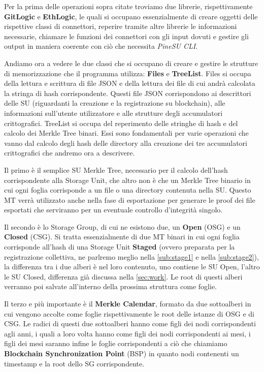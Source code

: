 Per la prima delle operazioni sopra citate troviamo due librerie, rispettivamente \textbf{GitLogic} e \textbf{EthLogic}, le quali si occupano essenzialmente di creare oggetti delle rispettive classi di connettori, reperire tramite altre librerie le informazioni necessarie, chiamare le funzioni dei connettori con gli input dovuti e gestire gli output in maniera coerente con ciò che necessita \emph{PineSU CLI}.

Andiamo ora a vedere le due classi che si occupano di creare e gestire le strutture di memorizzazione che il programma utilizza: \textbf{Files} e \textbf{TreeList}.
Files si occupa della lettura e scrittura di file JSON e della lettura dei file di cui andrà calcolata la stringa di hash corrispondente. Questi file JSON corrispondono ai descrittori delle SU (riguardanti la creazione e la registrazione su blockchain), alle informazioni sull’utente utilizzatore e alle strutture degli accumulatori crittografici.
TreeList si occupa del reperimento delle stringhe di hash e del calcolo dei Merkle Tree binari.
Essi sono fondamentali per varie operazioni che vanno dal calcolo degli hash delle directory alla creazione dei tre accumulatori crittografici che andremo ora a descrivere.

Il primo è il semplice SU Merkle Tree, necessario per il calcolo dell’hash corrispondente alla Storage Unit, che altro non è che un Merkle Tree binario in cui ogni foglia corrisponde a un file o una directory contenuta nella SU. Questo MT verrà utilizzato anche nella fase di esportazione per generare le proof dei file esportati che serviranno per un eventuale controllo d’integrità singolo.

Il secondo è lo Storage Group, di cui ne esistono due, un \textbf{Open} (OSG) e un \textbf{Closed} (CSG). Si tratta essenzialmente di due MT binari in cui ogni foglia corrisponde all’hash di una Storage Unit \textbf{Staged} (ovvero preparata per la registrazione collettiva, ne parlremo meglio nella \autoref{sub:stage1} e nella \autoref{sub:stage2}), la differenza tra i due alberi è nel loro contenuto, uno contiene le SU Open, l’altro le SU Closed, differenza già discussa nella \autoref{sec:work}. Le root di questi alberi verranno poi salvate all’interno della prossima struttura come foglie.

Il terzo e più importante è il \textbf{Merkle Calendar}, formato da due sottoalberi in cui vengono accolte come foglie rispettivamente le root delle istanze di OSG e di CSG. Le radici di questi due sottoalberi hanno come figli dei nodi corrispondenti agli anni, i quali a loro volta hanno come figli dei nodi corrispondenti ai mesi, i figli dei mesi saranno infine le foglie corrispondenti a ciò che chiamiamo \textbf{Blockchain Synchronization Point} (BSP) in quanto nodi contenenti un timestamp e la root dello SG corrispondente.

